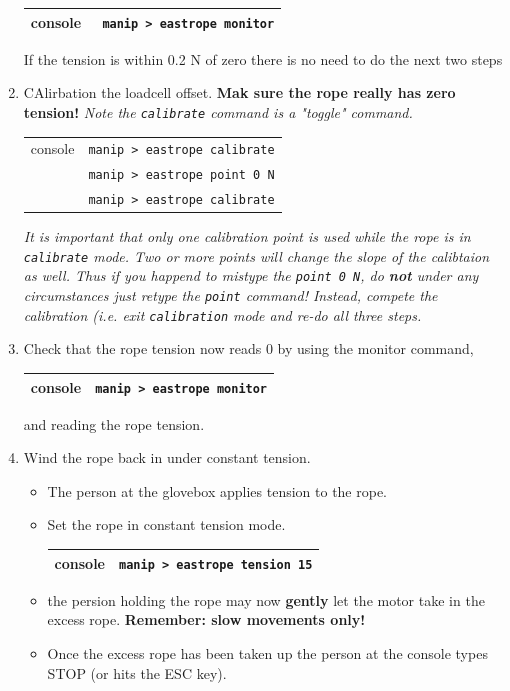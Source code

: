 \documentclass[11pt]{article}
\begin{document}
\begin{enumerate}
\begin{center}
\begin{tabular}{|c|c|}
\hline
console & \verb+ manip > eastrope monitor+ \\
\hline
\end{tabular}
\end{center}
If the tension is within 0.2 N of zero there is no need to do the next two steps
\item \CheckBox[name=cesr5]{} CAlirbation the loadcell offset. {\bf Mak sure the rope really has zero tension!} {\it Note the \verb+calibrate+ command is a "toggle" command.}
\begin{center}
	\begin{tabular}{|c|c|}
	\hline
	console & \verb+manip > eastrope calibrate+ \\
	              & \verb+manip > eastrope point 0 N+ \\
	              & \verb+manip > eastrope calibrate+ \\
	           \hline
	\end{tabular}
	\end{center}
{\it It is important that only one calibration point is used while the rope is in \verb+calibrate+ mode. Two or more points will change the slope of the calibtaion as well. Thus if you happend to mistype the \verb+point 0 N+, do {\bf not} under any circumstances just retype the \verb+point+ command! Instead, compete the calibration (i.e. exit \verb+calibration+ mode and re-do all three steps.}
\item \CheckBox[name=cesr6]{} Check that the rope tension now reads 0 by using the monitor command,
\begin{center}
\begin{tabular}{|c|c|}
\hline
console & \verb+manip > eastrope monitor+ \\
\hline
\end{tabular}
\end{center}
and reading the rope tension.
\item \CheckBox[name=cesr7]{} Wind the rope back in under constant tension.
\begin{itemize}
\item The person at the glovebox applies tension to the rope.
\item Set the rope in constant tension mode.
\begin{center}
\begin{tabular}{|c|c|}
\hline
console & \verb+manip > eastrope tension 15+ \\
\hline
\end{tabular}
\end{center}
\item the persion holding the rope may now {\bf gently} let the motor take in the excess rope. {\bf Remember: slow movements only!}
\item Once the excess rope has been taken up the person at the console types STOP (or hits the ESC key).
\end{itemize}
\end{enumerate}
\end{document}
